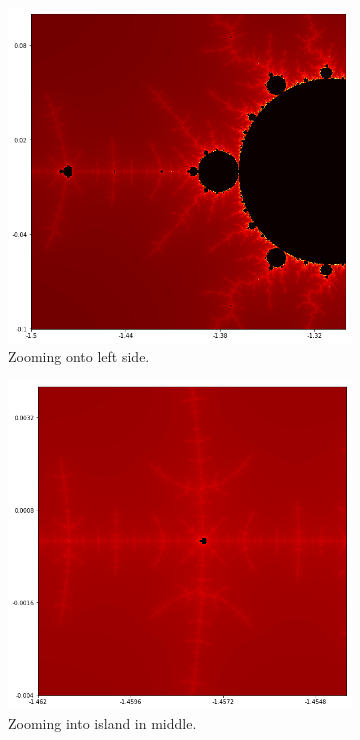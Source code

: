 \documentclass{amsart}
\theoremstyle{definition}
\theoremstyle{remark}
\numberwithin{equation}{section}
\begin{document}
\begin{figure}[h]
\centering
\begin{subfigure}{.4\textwidth}
  \centering
  \includegraphics[width=.8\linewidth]{Mandelbrot_c_zoom.png}
  \caption{Zooming onto left side.}
\end{subfigure}%
\begin{subfigure}{.4\textwidth}
  \centering
  \includegraphics[width=.8\linewidth]{Mandelbrot_c_zoom1.png}
  \caption{Zooming into island in middle.}
\end{subfigure}
\begin{subfigure}{.4\textwidth}
  \centering

\end{subfigure}
\end{figure}
\end{document}
